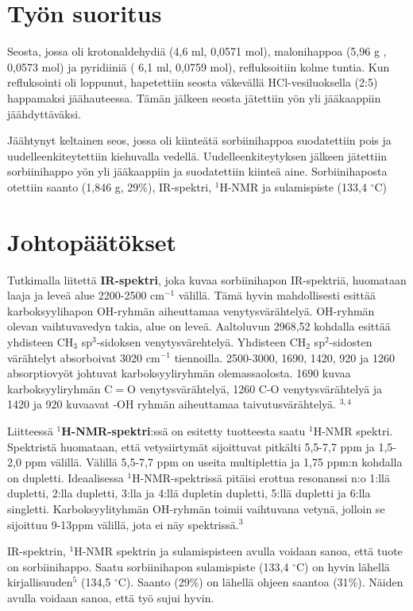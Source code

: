 \documentclass[11pt,a4paper]{article}
\begin{document}
\section{Työn suoritus}

Seosta, jossa oli krotonaldehydiä (4,6 ml, 0,0571 mol), malonihappoa (5,96 g , 0,0573 mol) ja pyridiiniä ( 6,1 ml, 0,0759 mol), refluksoitiin kolme tuntia. Kun refluksointi oli loppunut, hapetettiin seosta väkevällä HCl-vesiluoksella (2:5) happamaksi jäähauteessa. Tämän jälkeen seosta jätettiin yön yli jääkaappiin jäähdyttäväksi. 

Jäähtynyt keltainen seos, jossa oli kiinteätä sorbiinihappoa suodatettiin pois ja uudelleenkiteytettiin kiehuvalla vedellä. Uudelleenkiteytyksen jälkeen jätettiin  sorbiinihappo yön yli jääkaappiin ja suodatettiin kiinteä aine. Sorbiinihaposta otettiin saanto (1,846 g, 29$\%$), IR-spektri, $^1$H-NMR ja sulamispiste (133,4 $^\circ$C)

\section{Johtopäätökset}

Tutkimalla liitettä \textbf{IR-spektri}, joka kuvaa sorbiinihapon IR-spektriä, huomataan laaja ja leveä alue 2200-2500 cm$^{-1}$ välillä. Tämä hyvin mahdollisesti esittää karboksyylihapon OH-ryhmän aiheuttamaa venytysvärähtelyä. OH-ryhmän olevan vaihtuvavedyn takia, alue on leveä. Aaltoluvun 2968,52 kohdalla esittää yhdisteen CH$_3$ sp$^3$-sidoksen venytysvärehtelyä. Yhdisteen CH$_2$ sp$^2$-sidosten värähtelyt absorboivat 3020 cm$^{-1}$ tiennoilla. 2500-3000, 1690, 1420, 920 ja 1260 absorptiovyöt johtuvat karboksyyliryhmän olemassaolosta. 1690 kuvaa karboksyyliryhmän C$=$O venytysvärähtelyä, 1260 C-O venytysvärähtelyä ja 1420 ja 920 kuvaavat -OH ryhmän aiheuttamaa taivutusvärähtelyä. $^{3,4}$

Liitteessä \textbf{$^1$H-NMR-spektri}:ssä on esitetty tuotteesta saatu $^1$H-NMR spektri.  Spektristä huomataan, että vetysiirtymät sijoittuvat pitkälti 5,5-7,7 ppm ja 1,5-2,0 ppm välillä. Välillä 5,5-7,7 ppm on useita multiplettia ja 1,75 ppm:n kohdalla on dupletti. Ideaalisessa $^1$H-NMR-spektrissä pitäisi erottua resonanssi n:o 1:llä dupletti, 2:lla dupletti, 3:lla ja 4:llä dupletin dupletti, 5:llä dupletti ja 6:lla singletti. Karboksyylityhmän OH-ryhmän toimii vaihtuvana vetynä, jolloin se sijoittuu 9-13ppm välillä, jota ei näy spektrissä.$^3$  

IR-spektrin, $^1$H-NMR spektrin ja sulamispisteen avulla voidaan sanoa, että tuote on sorbiinihappo. Saatu sorbiinihapon sulamispiste (133,4 $^\circ$C) on hyvin lähellä kirjallisuuden$^5$ (134,5 $^\circ$C). Saanto (29$\%$) on lähellä ohjeen saantoa (31$\%$). Näiden avulla voidaan sanoa, että työ sujui hyvin. 
\end{document}
